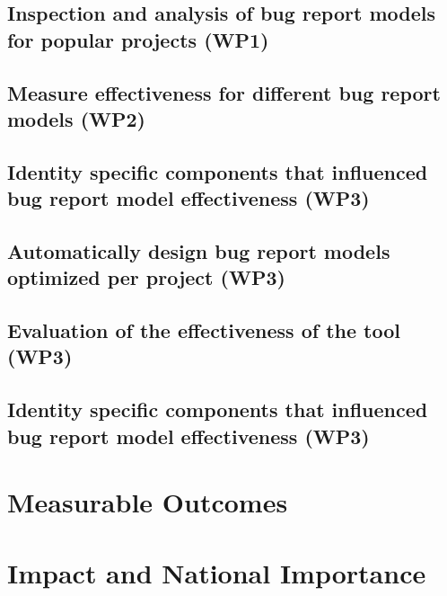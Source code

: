 \documentclass[11pt,english,twocolumn]{article}
\begin{document}
\subsection*{Inspection and analysis of bug report models for popular projects (WP1)}

\subsection*{Measure effectiveness for different bug report models (WP2)}

\subsection*{Identity specific components that influenced bug report model effectiveness (WP3)}

\subsection*{Automatically design bug report models optimized per project (WP3)}

\subsection*{Evaluation of the effectiveness of the tool (WP3)}

\subsection*{Identity specific components that influenced bug report model effectiveness (WP3)}

\section{Measurable Outcomes}

\section{Impact and National Importance}

\let\oldbibliography\thebibliography
\renewcommand{\thebibliography}[1]{\oldbibliography{#1}
\setlength{\itemsep}{-3pt}}


{
\scriptsize

}
\end{document}
